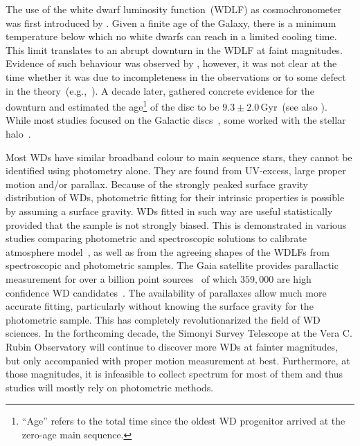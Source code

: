 \documentclass[fleqn,usenatbib]{rasti}
\begin{document}
The use of the white dwarf luminosity function~(WDLF) as cosmochronometer was
first introduced by \citet{1959ApJ...129..243S}. Given a finite age of the
Galaxy, there is a minimum temperature below which no white dwarfs can reach in
a limited cooling time. This limit translates to an abrupt downturn in the WDLF
at faint magnitudes. Evidence of such behaviour was observed by
\citet{1979ApJ...233..226L}, however, it was not clear at the time whether it
was due to incompleteness in the observations or to some defect in the
theory~(e.g.,~\citealp{1984ApJ...282..615I}). A decade later,
\citet{1987ApJ...315L..77W} gathered concrete evidence for the downturn and
estimated the age\footnote{``Age'' refers to the total time since the oldest
WD progenitor arrived at the zero-age main sequence.} of the disc to be
$9.3 \pm 2.0$\,Gyr~(see also \citealt{1988ApJ...332..891L}). While most studies
focused on the Galactic discs~\citep{1989LNP...328...15L, 1992ApJ...386..539W,
1995LNP...443...24O, 1998ApJ...497..294L, 1999MNRAS.306..736K,
2012ApJS..199...29G}, some worked with the stellar
halo~\citep{2006AJ....131..571H, 2011MNRAS.417...93R, 2017AJ....153...10M,
2019MNRAS.482..715L}. 
 
Most WDs have similar broadband colour to main sequence stars, they cannot be
identified using photometry alone. They are found from UV-excess, large
proper motion and/or parallax. Because of the strongly peaked surface gravity
distribution of WDs, photometric fitting for their intrinsic properties
is possible by assuming a surface gravity. WDs fitted in such way are useful
statistically provided that the sample is not strongly biased. This is
demonstrated in various studies comparing photometric and spectroscopic
solutions to calibrate atmosphere
model~\citep{2019ApJ...871..169G, 2019ApJ...882..106G}, as well as from the
agreeing shapes of the WDLFs from spectroscopic and photometric samples. The
Gaia satellite provides parallactic measurement for over a billion point
sources~\citep{2021A&A...649A...1G, 2021AJ....161..147B} of which $359,000$
are high confidence WD candidates~\citep{2021MNRAS.508.3877G}. The availability
of parallaxes allow much more accurate fitting, particularly without knowing
the surface gravity for the photometric sample. This has completely 
revolutionarized the field of WD sciences. In the forthcoming decade, the
Simonyi Survey Telescope at the Vera C. Rubin Observatory will continue to
discover more WDs at fainter magnitudes, but only accompanied with proper
motion measurement at best. Furthermore, at those magnitudes, it is infeasible
to collect spectrum for most of them and thus studies will mostly rely on
photometric methods.
\end{document}
